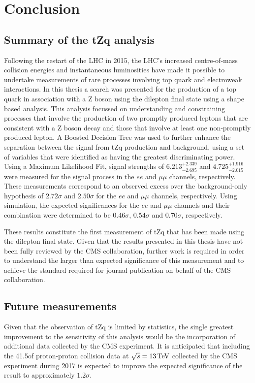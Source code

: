 \chapter{Conclusion}\label{chapter:conclusion}
\section{Summary of the tZq analysis}
Following the restart of the LHC in 2015, the LHC's increased centre-of-mass collision energies and instantaneous luminosities have made it possible to undertake measurements of rare processes involving top quark and electroweak interactions.
In this thesis a search was presented for the production of a top quark in association with a Z boson using the dilepton final state using a shape based analysis.
This analysis focussed on understanding and constraining processes that involve the production of two promptly produced leptons that are consistent with a Z boson decay and those that involve at least one non-promptly produced lepton.
A Boosted Decision Tree was used to further enhance the separation between the signal from tZq production and background, using a set of variables that were identified as having the greatest discriminating power.
Using a Maximum Likelihood Fit, signal strengths of $6.213_{-2.695}^{+2.339}$ and $4.725_{-2.015}^{+1.916}$ were measured for the signal process in the $ee$ and $\mu\mu$ channels, respectively.
These measurements correspond to an observed excess over the background-only hypothesis of $2.72\sigma$ and $2.50\sigma$ for the $ee$ and $\mu\mu$ channels, respectively.
Using simulation, the expected significances for the $ee$ and $\mu\mu$ channels and their combination were determined to be $0.46\sigma$, $0.54\sigma$ and $0.70\sigma$, respectively.

These results constitute the first measurement of tZq that has been made using the dilepton final state.
Given that the results presented in this thesis have not been fully reviewed by the CMS collaboration, further work is required in order to understand the larger than expected significance of this measurement and to achieve the standard required for journal publication on behalf of the CMS collaboration.

\section{Future measurements}
Given that the observation of tZq is limited by statistics, the single greatest improvement to the sensitivity of this analysis would be the incorporation of additional data collected by the CMS experiment.
It is anticipated that including the 41.5\fbinv of proton-proton collision data at $\sqrt{s} = 13\,\text{Te\hspace{-.08em}V}$ collected by the CMS experiment during 2017 is expected to improve the expected significance of the result to approximately $1.2\sigma$.


